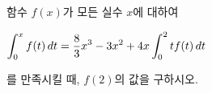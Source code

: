 함수 $f(x)$가 모든 실수 $x$에 대하여 \par\smallskip\noindent\hspace*{1.5em}$\displaystyle\int_{0}^{x}f(t)\mkern3mu dt=\dfrac{8}{3}x^3-3x^2+4x\int_{0}^{2}tf(t)\mkern3mu dt$\par\smallskip\noindent 를 만족시킬 때, $f(2)$의 값을 구하시오.

